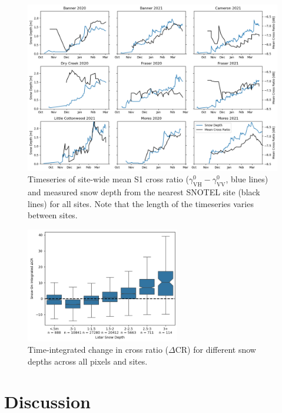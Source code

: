 \documentclass[journal abbreviation, manuscript]{copernicus}
\begin{document}
\begin{figure}[htbp]
    \centering
    \includegraphics[width=\textwidth]{figures/cross_ratio_all_sites.png}
    \caption{Timeseries of site-wide mean S1 cross ratio ($\gamma^0_{\mathrm{VH}} - \gamma^0_{\mathrm{VV}}$, blue lines) and measured snow depth from the nearest SNOTEL site (black lines) for all sites. Note that the length of the timeseries varies between sites.}
    \label{fig:cross_ratio_allsites}
\end{figure}


\begin{figure}[htbp]
    \centering
    \includegraphics[width=0.6\textwidth]{figures/cross_ratio_summary.png}
    \caption{Time-integrated change in cross ratio ($\Delta$CR) for different snow depths across all pixels and sites.}
    \label{fig:cross_ratio_boxplots}
\end{figure}
\clearpage

\section{Discussion}
\end{document}
